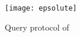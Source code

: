 \begin{figure}[h]
	\centering
	\texttt{[image: epsolute]}
	\caption{Query protocol \protocolQuery{} of \epsolute{}}\label{figure:epsolute}
\end{figure}
